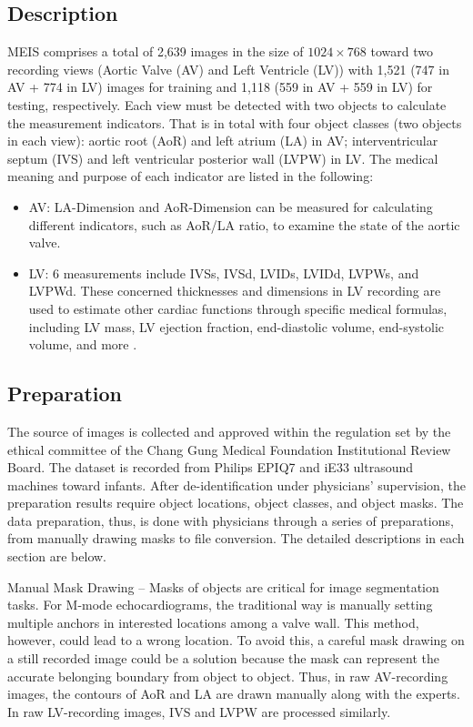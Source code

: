 \documentclass{article}
\begin{document}
\subsection{Description}
\label{sec3.1}
MEIS comprises a total of 2,639 images in the size of $1024\times768$ toward two recording views (Aortic Valve (AV) and Left Ventricle (LV)) with 1,521 (747 in AV + 774 in LV) images for training and 1,118 (559 in AV + 559 in LV) for testing, respectively. Each view must be detected with two objects to calculate the measurement indicators.  That is in total with four object classes (two objects in each view):  aortic root (AoR) and left atrium (LA) in AV; interventricular septum (IVS) and left ventricular posterior wall (LVPW) in LV. The medical meaning and purpose of each indicator are listed in the following:
\begin{itemize}
\item AV: LA-Dimension and AoR-Dimension can be measured for calculating different indicators, such as AoR/LA ratio, to examine the state of the aortic valve.
\item LV: 6 measurements include IVSs, IVSd, LVIDs, LVIDd, LVPWs, and LVPWd. These concerned thicknesses and dimensions in LV recording are used to estimate other cardiac functions through specific medical formulas, including LV mass, LV ejection fraction, end-diastolic volume, end-systolic volume, and more \cite{wandt1999echocardiographic}\cite{mizukoshi2016normal}.
\end{itemize}

\subsection{Preparation}
\label{sec3.2}
The source of images is collected and approved within the regulation set by the ethical committee of the Chang Gung Medical Foundation Institutional Review Board. The dataset is recorded from Philips EPIQ7 and iE33 ultrasound machines toward infants. After de-identification under physicians’ supervision, the preparation results require object locations, object classes, and object masks. The data preparation, thus, is done with physicians through a series of preparations, from manually drawing masks to file conversion. The detailed descriptions in each section are below.

Manual Mask Drawing – Masks of objects are critical for image segmentation tasks. For M-mode echocardiograms, the traditional way is manually setting multiple anchors in interested locations among a valve wall. This method, however, could lead to a wrong location. To avoid this, a careful mask drawing on a still recorded image could be a solution because the mask can represent the accurate belonging boundary from object to object. Thus, in raw AV-recording images, the contours of AoR and LA are drawn manually along with the experts. In raw LV-recording images, IVS and LVPW are processed similarly. 
\end{document}
